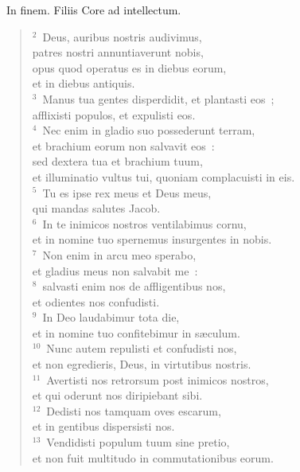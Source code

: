 ~\lettrine[lines=10,image=true,loversize=0.05,lraise=-0.03]{I}{}n finem. Filiis Core ad intellectum.
\begin{flushleft}\begin{verse}\vspace{6pt}${}^{2}$~Deus, auribus nostris audivimus,\\ patres nostri annuntiaverunt nobis,\\ opus quod operatus es in diebus eorum,\\ et in diebus antiquis.\\
${}^{3}$~Manus tua gentes disperdidit, et plantasti eos~;\\ afflixisti populos, et expulisti eos.\\
${}^{4}$~Nec enim in gladio suo possederunt terram,\\ et brachium eorum non salvavit eos~:\\ sed dextera tua et brachium tuum,\\ et illuminatio vultus tui, quoniam complacuisti in eis.\\
${}^{5}$~Tu es ipse rex meus et Deus meus,\\ qui mandas salutes Jacob.\\
${}^{6}$~In te inimicos nostros ventilabimus cornu,\\ et in nomine tuo spernemus insurgentes in nobis.\\
${}^{7}$~Non enim in arcu meo sperabo,\\ et gladius meus non salvabit me~:\\
${}^{8}$~salvasti enim nos de affligentibus nos,\\ et odientes nos confudisti.\\
${}^{9}$~In Deo laudabimur tota die,\\ et in nomine tuo confitebimur in s\ae culum.\\
${}^{10}$~Nunc autem repulisti et confudisti nos,\\ et non egredieris, Deus, in virtutibus nostris.\\
${}^{11}$~Avertisti nos retrorsum post inimicos nostros,\\ et qui oderunt nos diripiebant sibi.\\
${}^{12}$~Dedisti nos tamquam oves escarum,\\ et in gentibus dispersisti nos.\\
${}^{13}$~Vendidisti populum tuum sine pretio,\\ et non fuit multitudo in commutationibus eorum.\\

\end{verse}
\end{flushleft}
